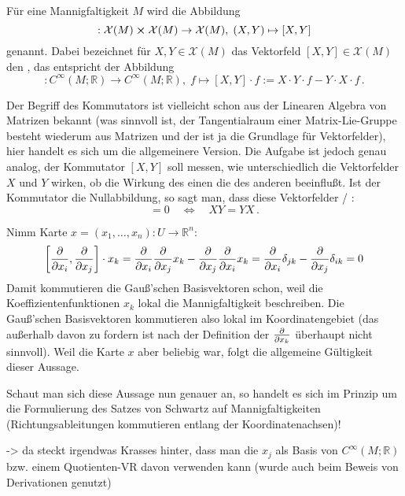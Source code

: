 \documentclass[../H_Analysis_main.tex]{subfiles}
\begin{document}
\begin{defi}[Kommutator]
Für eine Mannigfaltigkeit $M$ wird die Abbildung
\begin{equation}
[\cdot, \cdot]: \mathcal{X}(M) \cross \mathcal{X}(M) \rightarrow \mathcal{X}(M), \; (X, Y) \mapsto [X, Y]
\end{equation}
 genannt. Dabei bezeichnet für $X, Y \in \mathcal{X}(M)$ das Vektorfeld $[X, Y] \in \mathcal{X}(M)$ den , das entspricht der Abbildung
\begin{equation}
[X, Y]: C^\infty(M; \mathbb{R}) \rightarrow C^\infty(M; \mathbb{R}), \; f \mapsto [X, Y] \cdot f := X \cdot Y \cdot f - Y \cdot X \cdot f \, .
\end{equation}
\end{defi}
Der Begriff des Kommutators ist vielleicht schon aus der Linearen Algebra von Matrizen bekannt (was sinnvoll ist, der Tangentialraum einer Matrix-Lie-Gruppe besteht wiederum aus Matrizen und der ist ja die Grundlage für Vektorfelder), hier handelt es sich um die allgemeinere Version. Die Aufgabe ist jedoch genau analog, der Kommutator $[X, Y]$ soll messen, wie unterschiedlich die Vektorfelder $X$ und $Y$ wirken, ob die Wirkung des einen die des anderen beeinflußt. Ist der Kommutator die Nullabbildung, so sagt man, dass diese Vektorfelder / :
\begin{equation*}
[X, Y] = 0 \quad \Leftrightarrow \quad XY = YX \, .
\end{equation*}


\begin{bsp}
Nimm Karte $x = (x_1, \dots, x_n): U \rightarrow \mathbb{R}^n$:
\begin{equation}
\qty[\pdv{x_i}, \pdv{x_j}] \cdot x_k = \pdv{x_i} \pdv{x_j} x_k - \pdv{x_j} \pdv{x_i} x_k = \pdv{x_i} \delta_{jk} - \pdv{x_j} \delta_{ik} = 0
\end{equation}
Damit kommutieren die Gauß'schen Basisvektoren schon, weil die Koeffizientenfunktionen $x_k$ lokal die Mannigfaltigkeit beschreiben. Die Gauß'schen Basisvektoren kommutieren also lokal im Koordinatengebiet (das außerhalb davon zu fordern ist nach der Definition der $\pdv{x_k}$ überhaupt nicht sinnvoll). Weil die Karte $x$ aber beliebig war, folgt die allgemeine Gültigkeit dieser Aussage.

Schaut man sich diese Aussage nun genauer an, so handelt es sich im Prinzip um die Formulierung des Satzes von Schwartz auf Mannigfaltigkeiten (Richtungsableitungen kommutieren entlang der Koordinatenachsen)!

-> da steckt irgendwas Krasses hinter, dass man die $x_j$ als Basis von $C^\infty(M; \mathbb{R})$ bzw. einem Quotienten-VR davon verwenden kann (wurde auch beim Beweis von Derivationen genutzt)
\end{bsp}
\end{document}
